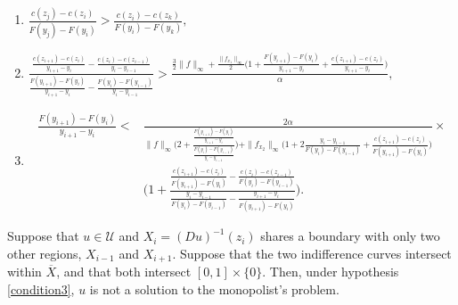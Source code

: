 \documentclass[10pt,a4paper]{amsart}
\begin{document}
\begin{enumerate}[label={(H\arabic*)}]
\item \label{condition2} $ \frac{c(z_j)-c(z_i)}{F(y_j)-F(y_i)}>\frac{c(z_i)-c(z_k)}{F(y_i)-F(y_k)},$\vspace{3pt}
  \item \label{condition3} $\frac{\frac{c(z_{i+1})-c(z_i)}{y_{i+1}-y_i}-\frac{c(z_i)-c(z_
  {i-1})}{y_i-y_{i-1}}}{\frac{F(y_{i+1})-F(y_i)}{y_{i+1}-y_i}-\frac{F(y_i)-F(y_{i-1})}{y_i-y_{i-1}}}>\frac{\frac{3}{2}\|f\|_\infty+\frac{\|f_{x_1}\|_\infty}{2}\Big(1+\frac{F(y_{i+1})-F(y_i)}{y_{i+1}-y_i} +\frac{c(z_{i+1})-c(z_i)}{y_{i+1}-y_i}\Big)}{\alpha},$
  
   \item \label{condition4} 
   \[\begin{array}{ll}
   \frac{F(y_{i+1})-F(y_{i})}{y_{i+1}-y_{i}}<&  \frac{2\alpha}{\|f\|_\infty\Big(2+\frac{\frac{F(y_{i+1})-F(y_{i})}{y_{i+1}-y_{i}}}{\frac{F(y_i)-F(y_{i-1})}{y_i-y_{i-1}}}\Big)+\|f_{x_2}\|_\infty\Big(1+2\frac{y_{i}-y_{i-1}}{F(y_{i})-F(y_{i-1})}+\frac{c(z_{i+1})-c(z_i)}{F(y_{i+1})-F(y_i)}\Big)}\times\\
   &\Bigg(1+\frac{\frac{c(z_{i+1})-c(z_i)}{F(y_{i+1})-F(y_i)}-\frac{c(z_{i})-c(z_{i-1})}{F(y_i)-F(y_{i-1})}}{\frac{y_{i}-y_{i-1}}{F(y_{i})-F(y_{i-1})}-\frac{y_{i+1}-y_i}{F(y_{i+1})-F(y_{i})}}\Bigg).
   \end{array}\]


\end{enumerate}

\begin{lem}\label{case1}
         Suppose that $u \in \mathcal{U}$ and $X_i =(Du)^{-1}(z_i)$ shares a boundary with only two other regions, $X_{i-1}$ and $X_{i+1}$.  Suppose that the two indifference curves intersect within $\overline{X}$, and that both intersect $[0,1]\times\{0\}$.  Then, under hypothesis   \ref{condition3}, $u$ is not a solution to the monopolist's problem.   
    \end{lem}
\end{document}
